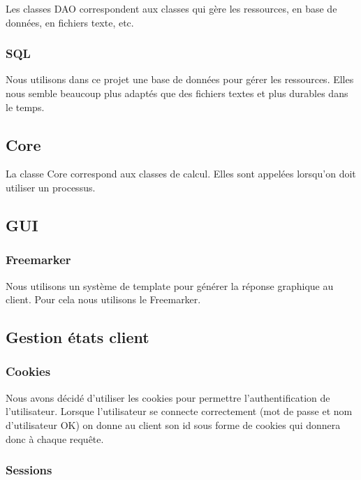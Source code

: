 \documentclass[11pt]{article}
\begin{document}
Les classes DAO correspondent aux classes qui gère les ressources, en
base de données, en fichiers texte, etc.

\subsubsection{SQL}
\label{sec:orgae99cda}

Nous utilisons dans ce projet une base de données pour gérer les ressources.
Elles nous semble beaucoup plus adaptés que des fichiers textes et plus
durables dans le temps.

\subsection{Core}
\label{sec:orgd1d43be}

La classe Core correspond aux classes de calcul. Elles sont appelées
lorsqu'on doit utiliser un processus.

\subsection{GUI}
\label{sec:orgc229483}
\subsubsection{Freemarker}
\label{sec:orgc60259a}

Nous utilisons un système de template pour générer la réponse graphique au client.
Pour cela nous utilisons le Freemarker.

\subsection{Gestion états client}
\label{sec:org06062ee}
\subsubsection{Cookies}
\label{sec:org1ef1d5d}

Nous avons décidé d'utiliser les cookies pour permettre l'authentification
de l'utilisateur. Lorsque l'utilisateur se connecte correctement (mot de
passe et nom d'utilisateur OK) on donne au client son id sous forme de
cookies qui donnera donc à chaque requête.

\subsubsection{Sessions}
\label{sec:orgb4cb53f}
\end{document}
